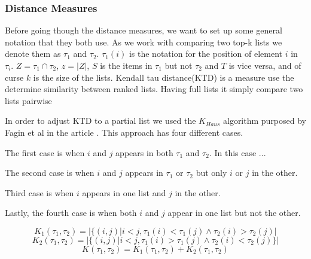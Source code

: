 \subsubsection{Distance Measures}\label{sec:distance}
Before going though the distance measures, we want to set up some general notation that they both use. As we work with comparing two top-k lists we denote them as $\tau_1$ and $\tau_2$. $\tau_1 (i)$ is the notation for the position of element $i$ in $\tau_i$. $Z = \tau_1 \cap \tau_2$, $z=|Z|$, $S$ is the items in $\tau_1$ but not $\tau_2$ and $T$ is vice versa, and of curse $k$ is the size of the lists. 
Kendall tau distance(KTD) is a measure use the determine similarity between ranked lists. Having full lists it simply compare two lists pairwise 

In order to adjust KTD to a partial list we used the $K_{Haus}$ algorithm purposed by Fagin et al in the article \cite{comparing:topk}. This approach has four different cases. 

The first case is when $i$ and $j$ appears in both $\tau_1$ and $\tau_2$. In this case ...

The second case is when $i$ and $j$ appears in $\tau_1$ or $\tau_2$ but only $i$ or $j$ in the other.

Third case is when $i$ appears in one list and $j$ in the other.

Lastly, the fourth case is when both $i$ and $j$ appear in one list but not the other.



\begin{equation}\label{eq:kendalldistance1}
K_1(\tau_1,\tau_2) = | \{(i,j) | i < j, \tau_1 (i) < \tau_1 (j) \land \tau_2 (i) > \tau_2 (j)|
\end{equation}
\begin{equation}\label{eq:kendalldistance2}
K_2(\tau_1,\tau_2) = | \{(i,j) | i < j, \tau_1 (i) > \tau_1 (j) \land \tau_2 (i) < \tau_2 (j) \} |
\end{equation}
\begin{equation}\label{eq:kendalldistancefinal}
K(\tau_1,\tau_2) = K_1(\tau_1,\tau_2) + K_2(\tau_1,\tau_2)
\end{equation}

